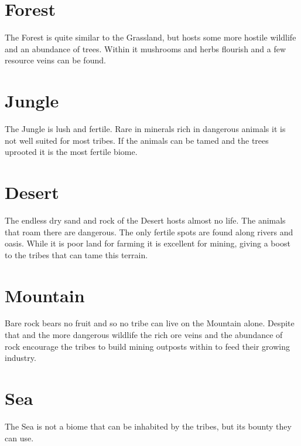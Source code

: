 \section{Forest}\label{ch:World:Biomes:Forest}
The \gls*{Forest} is quite similar to the \gls{Grassland}, but hosts some more
hostile wildlife and an abundance of trees. Within it mushrooms and herbs
flourish and a few resource veins can be found.

\section{Jungle}\label{ch:World:Biomes:Jungle}
The \gls*{Jungle} is lush and fertile. Rare in minerals rich in dangerous
animals it is not well suited for most tribes. If the animals can be tamed and
the trees uprooted it is the most fertile biome.

\section{Desert}\label{ch:World:Biomes:Desert}
The endless dry sand and rock of the \gls*{Desert} hosts almost no life. The
animals that roam there are dangerous. The only fertile spots are found along
rivers and oasis. While it is poor land for farming it is excellent for mining,
giving a boost to the tribes that can tame this terrain.

\section{Mountain}\label{ch:World:Biomes:Mountain}
Bare rock bears no fruit and so no tribe can live on the \gls*{Mountain} alone.
Despite that and the more dangerous wildlife the rich ore veins and the
abundance of rock encourage the tribes to build mining outposts within to feed
their growing industry.

\section{Sea}\label{ch:World:Biomes:Sea}
The \gls*{Sea} is not a biome that can be inhabited by the tribes, but its
bounty they can use.
